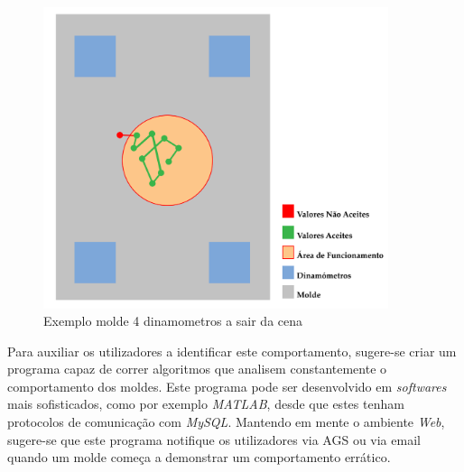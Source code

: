\documentclass[11pt,twoside,a4paper]{report}
\begin{document}
\begin{figure}[H]
	\begin{center}
		\includegraphics[width=0.9\textwidth]{exemplo_molde} %
		\caption{Exemplo molde 4 dinamometros a sair da cena}
		\label{fig:conclusoes4}
	\end{center}
\end{figure}
Para auxiliar os utilizadores a identificar este comportamento, sugere-se criar um programa capaz de correr algoritmos que analisem constantemente o comportamento dos moldes. Este programa pode ser desenvolvido em \textit{softwares} mais sofisticados, como por exemplo \textit{MATLAB}, desde que estes tenham protocolos de comunicação com \textit{MySQL}. Mantendo em mente o ambiente \textit{Web}, sugere-se que este programa notifique os utilizadores via AGS ou via email quando um molde começa a demonstrar um comportamento errático.

%
%
\cleardoublepage



%  
%
%
\end{document}
